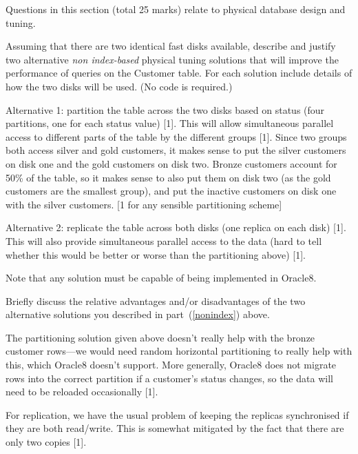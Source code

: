 \documentclass[markingschedule]{ouexam}
\begin{document}
\begin{examsection}{25}{}{Questions in this section (total 25 marks) relate to
physical database design and tuning.}
\begin{question}{10}
	\begin{subquestion}{7}
		\begin{subsubquestion}{5}
			\label{nonindex}
			Assuming that there are two identical fast disks available,
			describe and justify two alternative \emph{non index-based}
			physical tuning solutions that will improve the performance of
			queries on the \textsf{Customer} table. For each solution include
			details of how the two disks will be used. (No code is required.)
			\begin{marking}
				Alternative 1: partition the table across the two disks based
				on status (four partitions, one for each status value) [1].
				This will allow simultaneous parallel access to different parts
				of the table by the different groups [1]. Since two groups both
				access silver and gold customers, it makes sense to put the
				silver customers on disk one and the gold customers on disk
				two. Bronze customers account for 50\% of the table, so it
				makes sense to also put them on disk two (as the gold customers
				are the smallest group), and put the inactive customers on disk
				one with the silver customers. [1 for any sensible partitioning
				scheme]
	
				Alternative 2: replicate the table across both disks (one
				replica on each disk) [1]. This will also provide simultaneous
				parallel access to the data (hard to tell whether this would be
				better or worse than the partitioning above) [1].
	
				Note that any solution must be capable of being implemented in
				Oracle8.
			\end{marking}
		\end{subsubquestion}

		\begin{subsubquestion}{2}
			Briefly discuss the relative advantages and/or disadvantages of the
			two alternative solutions you described in part~(\ref{nonindex})
			above.
			\begin{marking}
				The partitioning solution given above doesn't really help with
				the bronze customer rows---we would need random horizontal
				partitioning to really help with this, which Oracle8 doesn't
				support. More generally, Oracle8 does not migrate rows into the
				correct partition if a customer's status changes, so the data
				will need to be reloaded occasionally [1].

				For replication, we have the usual problem of keeping the
				replicas synchronised if they are both read/write. This is
				somewhat mitigated by the fact that there are only two copies
				[1].
			\end{marking}
		\end{subsubquestion}
	\end{subquestion}
	

\end{question}
\end{examsection}
\end{document}
